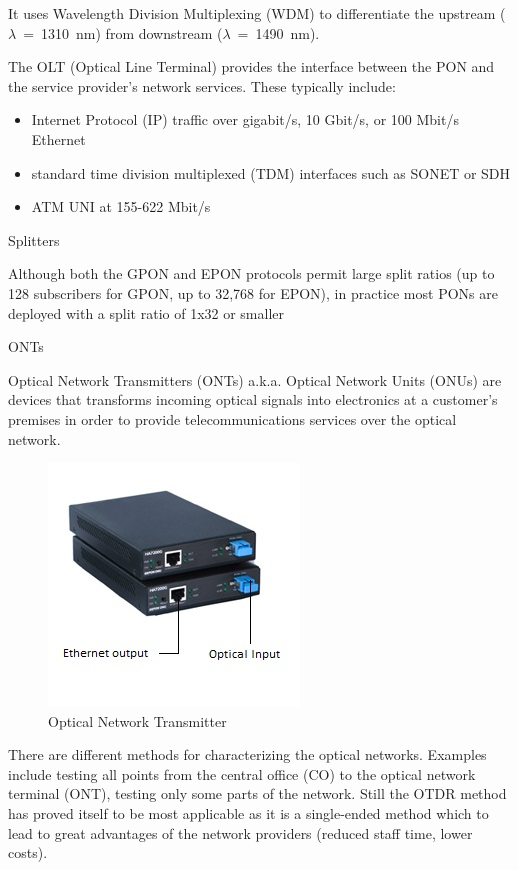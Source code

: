 It uses Wavelength Division Multiplexing (WDM) to differentiate the upstream ($\lambda$~=~1310~nm) from downstream ($\lambda~=~$1490~nm).

The OLT (Optical Line Terminal) provides the interface between the PON and the service provider's network services. These typically include:

\begin{itemize}
	\item Internet Protocol (IP) traffic over gigabit/s, 10 Gbit/s, or 100 Mbit/s Ethernet
\item standard time division multiplexed (TDM) interfaces such as SONET or SDH
\item ATM UNI at 155-622 Mbit/s
\end{itemize}

Splitters

Although both the GPON and EPON protocols permit large split ratios (up to 128 subscribers for GPON, up to 32,768 for EPON), in practice most PONs are deployed with a split ratio of 1x32 or smaller


ONTs

Optical Network Transmitters (ONTs) a.k.a. Optical Network Units (ONUs) are devices that transforms incoming optical signals into electronics at a customer's premises in order to provide telecommunications services over the optical network.
\begin{figure}%
\centering
\includegraphics[width=.4\columnwidth]{grafiken/onu.jpg}%
\caption{Optical Network Transmitter}%
\label{}%
\end{figure}

There are different methods for characterizing the optical networks. Examples include testing all points from the central office (CO) to the optical network terminal (ONT), testing only some parts of the network. Still the OTDR method has proved itself to be most applicable as it is a single-ended method which to lead to great advantages of the network providers (reduced staff time, lower costs).

